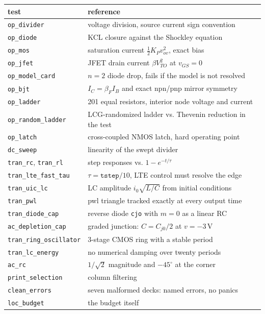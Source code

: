 \documentclass[11pt]{article}
\begin{document}
\begin{center}
\small
\begin{tabular}{lp{9.2cm}}
\toprule
test & reference \\
\midrule
\texttt{op\_divider} & voltage division, source current sign convention \\
\texttt{op\_diode} & KCL closure against the Shockley equation \\
\texttt{op\_mos} & saturation current $\tfrac{1}{2}K_P v_{ov}^2$, exact bias \\
\texttt{op\_jfet} & JFET drain current $\beta V_{TO}^2$ at $v_{GS} = 0$ \\
\texttt{op\_model\_card} & $n{=}2$ diode drop, fails if the model is not resolved \\
\texttt{op\_bjt} & $I_C = \beta_F I_B$ and exact npn/pnp mirror symmetry \\
\texttt{op\_ladder} & 201 equal resistors, interior node voltage and current \\
\texttt{op\_random\_ladder} & LCG-randomized ladder vs. Thevenin reduction in the test \\
\texttt{op\_latch} & cross-coupled NMOS latch, hard operating point \\
\texttt{dc\_sweep} & linearity of the swept divider \\
\texttt{tran\_rc}, \texttt{tran\_rl} & step responses vs. $1 - e^{-t/\tau}$ \\
\texttt{tran\_lte\_fast\_tau} & $\tau = \texttt{tstep}/10$, LTE control must resolve the edge \\
\texttt{tran\_uic\_lc} & LC amplitude $i_0 \sqrt{L/C}$ from initial conditions \\
\texttt{tran\_pwl} & pwl triangle tracked exactly at every output time \\
\texttt{tran\_diode\_cap} & reverse diode \texttt{cjo} with $m{=}0$ as a linear RC \\
\texttt{ac\_depletion\_cap} & graded junction: $C = C_{j0}/2$ at $v = -3$\,V \\
\texttt{tran\_ring\_oscillator} & 3-stage CMOS ring with a stable period \\
\texttt{tran\_lc\_energy} & no numerical damping over twenty periods \\
\texttt{ac\_rc} & $1/\sqrt{2}$ magnitude and $-45^\circ$ at the corner \\
\texttt{print\_selection} & column filtering \\
\texttt{clean\_errors} & seven malformed decks: named errors, no panics \\
\texttt{loc\_budget} & the budget itself \\
\bottomrule
\end{tabular}
\end{center}
\end{document}
